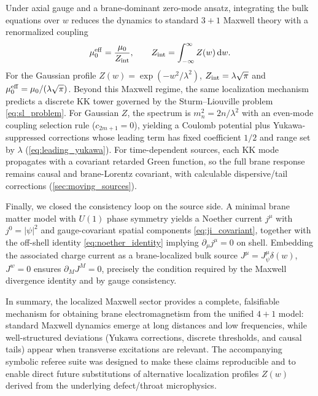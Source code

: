 \documentclass[11pt]{article}
\newcommand{\dd}{\mathrm d}
\newcommand{\J}{J}
\newcommand{\Z}{Z}
\newcommand{\lam}{\lambda}      %
\newcommand{\Zint}{Z_{\rm int}} %
\newcommand{\muo}{\mu_0}
\newcommand{\mueff}{\mu_0^{\rm eff}}
\begin{document}
Under axial gauge and a brane-dominant zero-mode ansatz, integrating the bulk
equations over \(w\) reduces the dynamics to standard \(3+1\) Maxwell theory with
a renormalized coupling
\begin{equation}
  \mueff = \frac{\muo}{\Zint},
  \qquad
  \Zint=\int_{-\infty}^{\infty}\Z(w)\,\dd w.
\end{equation}
For the Gaussian profile \(\Z(w)=\exp(-w^2/\lam^2)\), \(\Zint=\lam\sqrt{\pi}\) and
\(\mueff=\muo/(\lam\sqrt{\pi})\). Beyond this Maxwell regime, the same
localization mechanism predicts a discrete KK tower governed by the
Sturm--Liouville problem \cref{eq:sl_problem}. For Gaussian \(\Z\), the spectrum
is \(m_n^2=2n/\lam^2\) with an even-mode coupling selection rule
(\(c_{2m+1}=0\)), yielding a Coulomb potential plus Yukawa-suppressed corrections
whose leading term has fixed coefficient \(1/2\) and range set by \(\lam\)
(\cref{eq:leading_yukawa}). For time-dependent sources, each KK mode propagates
with a covariant retarded Green function, so the full brane response remains
causal and brane-Lorentz covariant, with calculable dispersive/tail corrections
(\cref{sec:moving_sources}).

Finally, we closed the consistency loop on the source side. A minimal brane
matter model with \(U(1)\) phase symmetry yields a Noether current \(j^\mu\) with
\(j^0=|\psi|^2\) and gauge-covariant spatial components \cref{eq:ji_covariant},
together with the off-shell identity \cref{eq:noether_identity} implying
\(\partial_\mu j^\mu=0\) on shell. Embedding the associated charge current as a
brane-localized bulk source \(\J^\mu=J_\psi^\mu\delta(w)\), \(\J^w=0\) ensures
\(\partial_M\J^M=0\), precisely the condition required by the Maxwell divergence
identity and by gauge consistency.

In summary, the localized Maxwell sector provides a complete, falsifiable
mechanism for obtaining brane electromagnetism from the unified \(4+1\) model:
standard Maxwell dynamics emerge at long distances and low frequencies, while
well-structured deviations (Yukawa corrections, discrete thresholds, and causal
tails) appear when transverse excitations are relevant. The accompanying symbolic
referee suite was designed to make these claims reproducible and to enable direct
future substitutions of alternative localization profiles \(\Z(w)\) derived from
the underlying defect/throat microphysics.

\appendix

\end{document}
